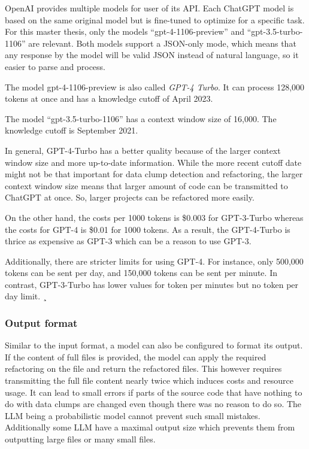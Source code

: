 OpenAI provides multiple models for user of its API. Each  ChatGPT model  is based on the same original model but is fine-tuned to optimize for a specific task. For this master thesis, only  the  models \enquote{gpt-4-1106-preview} and \enquote{gpt-3.5-turbo-1106} are relevant. Both models support a \ac{JSON}-only mode, which means that any response by the model will be valid \ac{JSON} instead of natural language, so it easier to parse and process. \cite{chatgpt_new_models}

The model {gpt-4-1106-preview} is also called \textit{GPT-4 Turbo}. It can process 128,000 tokens at once and has a knowledge cutoff of April 2023. \cite{chatgpt_new_models}

The model \enquote{gpt-3.5-turbo-1106} has a context window size of 16,000. The knowledge cutoff is September 2021. \cite{chatgpt_new_models}


In general, GPT-4-Turbo has a better quality because of the larger context window size and more up-to-date information. While the more recent cutoff date might not be that important for data clump detection and refactoring, the larger context window size means that larger amount of code can be transmitted to ChatGPT at once. So, larger projects can be refactored more easily.  \cite{chatgpt_new_models}

On the other hand, the costs per 1000 tokens is  \$0.003 for GPT-3-Turbo whereas the costs for GPT-4 is \$0.01 for 1000 tokens. As a result, the GPT-4-Turbo is thrice as expensive as GPT-3 which can be a reason to use GPT-3. \cite{chatgpt_new_models}

Additionally, there are  stricter limits for using GPT-4. For instance, only 500,000 tokens can be sent per day, and 150,000 tokens can be sent per minute. In contrast, GPT-3-Turbo has  lower values for token per minutes but no  token per day limit.  ¸\cite{chatgpt_limits}

\subsubsection{Output format}
 Similar to the input format, a model can also be configured to format its output. If the content of full files is provided, the model can  apply the required refactoring on the file and return the refactored files. This however requires transmitting the full file content nearly twice which induces costs and resource usage. It can lead to small errors if parts of the source code that have nothing to do with data clumps are changed even though there was no reason to do so. The \ac{LLM} being a probabilistic model cannot prevent such small mistakes. Additionally some \acs{LLM} have a maximal output size which prevents them from outputting large files or many small files.

